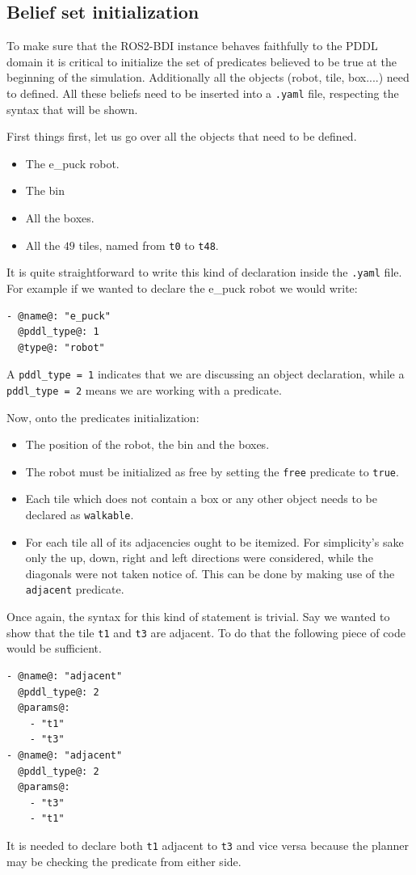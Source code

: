 \subsection{Belief set initialization}
To make sure that the ROS2-BDI instance behaves faithfully to the PDDL domain it is critical to initialize the set of predicates believed to be true at the beginning of the simulation. Additionally all the objects (robot, tile, box....) need to defined. All these beliefs need to be inserted into a \texttt{.yaml} file, respecting the syntax that will be shown.
\par
First things first, let us go over all the objects that need to be defined. 
\begin{itemize}
    \item The e\_puck robot.
    \item The bin
    \item All the boxes.
    \item All the $49$ tiles, named from \texttt{t0} to \texttt{t48}.
\end{itemize}
It is quite straightforward to write this kind of declaration inside the \texttt{.yaml} file. For example if we wanted to declare the e\_puck robot we would write:
\begin{lstlisting}
- @name@: "e_puck"
  @pddl_type@: 1
  @type@: "robot"
\end{lstlisting}
A \texttt{pddl\_type = 1} indicates that we are discussing an object declaration, while a \texttt{pddl\_type = 2} means we are working with a predicate.
\par
Now, onto the predicates initialization:
\begin{itemize}
    \item The position of the robot, the bin and the boxes.
    \item The robot must be initialized as free by setting the \texttt{free} predicate to \texttt{true}.
    \item Each tile which does not contain a box or any other object needs to be declared as \texttt{walkable}.
    \item For each tile all of its adjacencies ought to be itemized. For simplicity's sake only the up, down, right and left directions were considered, while the diagonals were not taken notice of. This can be done by making use of the \texttt{adjacent} predicate.
\end{itemize}
Once again, the syntax for this kind of statement is trivial. Say we wanted to show that the tile \texttt{t1} and \texttt{t3} are adjacent. To do that the following piece of code would be sufficient.
\begin{lstlisting}
- @name@: "adjacent"
  @pddl_type@: 2
  @params@: 
    - "t1"
    - "t3"
- @name@: "adjacent"
  @pddl_type@: 2
  @params@: 
    - "t3"
    - "t1"
\end{lstlisting}
It is needed to declare both \texttt{t1} adjacent to \texttt{t3} and vice versa because the planner may be checking the predicate from either side.
